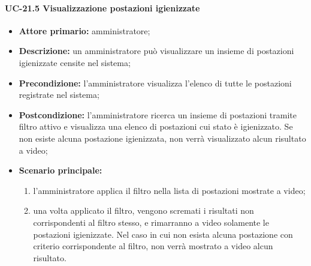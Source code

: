 \paragraph{UC-21.5 Visualizzazione postazioni igienizzate}
\begin{itemize}
    \item \textbf{Attore primario:} amministratore;
    \item \textbf{Descrizione:} un amministratore pu\`{o} visualizzare un insieme di postazioni igienizzate censite nel sistema;
    \item \textbf{Precondizione:} l'amministratore visualizza l'elenco di tutte le postazioni registrate nel sistema;
    \item \textbf{Postcondizione:} l'amministratore ricerca un insieme di postazioni tramite filtro attivo e visualizza una elenco di postazioni cui stato è igienizzato. Se non esiste alcuna postazione igienizzata, non verrà visualizzato alcun risultato a video;
    \item \textbf{Scenario principale:}
    \begin{enumerate}
        \item l'amministratore applica il filtro nella lista di postazioni mostrate a video;
        \item una volta applicato il filtro, vengono scremati i risultati non corrispondenti al filtro stesso, e rimarranno a video solamente le postazioni igienizzate. Nel caso in cui non esista alcuna postazione con criterio corrispondente al filtro, non verrà mostrato a video alcun risultato.
    \end{enumerate}
\end{itemize}

